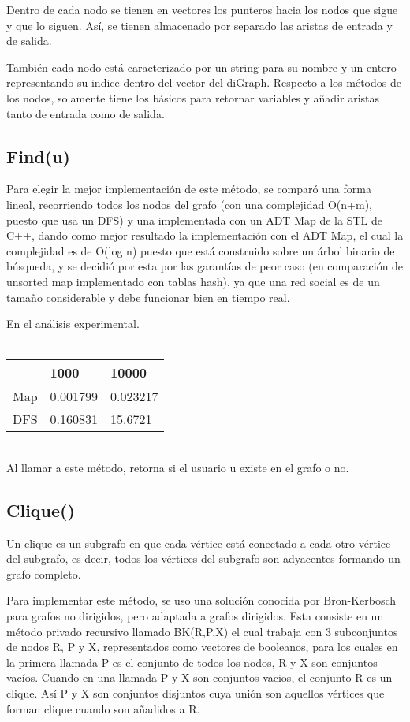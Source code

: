 \documentclass[12pt]{article}
\begin{document}
Dentro de cada nodo se tienen en vectores los punteros hacia los nodos que sigue y que lo siguen. Así, se tienen almacenado por separado las aristas de entrada y de salida.

También cada nodo está caracterizado por un string para su nombre y un entero representando su indice dentro del vector del diGraph. Respecto a los métodos de los nodos, solamente tiene los básicos para retornar variables y añadir aristas tanto de entrada como de salida.

\subsection{Find(u)}

\indent \indent Para elegir la mejor implementación de este método, se comparó una forma lineal, recorriendo todos los nodos del grafo (con una complejidad O(n+m), puesto que usa un DFS) y una implementada con un ADT Map de la STL de C++, dando como mejor resultado la implementación con el ADT Map, el cual la complejidad es de O(log n) puesto que está construido sobre un árbol binario de búsqueda, y se decidió por esta  por las garantías de peor caso (en comparación de unsorted map implementado con tablas hash), ya que una red social es de un tamaño considerable y debe funcionar bien en tiempo real.

En el análisis experimental.\\
\\
\begin{tabular}{l|l|l|}
\cline{2-3}
                          & 1000     & 10000    \\ \hline
\multicolumn{1}{|l|}{Map} & 0.001799 & 0.023217 \\ \hline
\multicolumn{1}{|l|}{DFS} & 0.160831 & 15.6721  \\ \hline
\end{tabular}
\\

Al llamar a este método, retorna si el usuario u existe en el grafo o no.

\subsection{Clique()}

\indent\indent Un clique es un subgrafo en que cada vértice está conectado a cada otro vértice del subgrafo, es decir, todos los vértices del subgrafo son adyacentes formando un grafo completo.

Para implementar este método, se uso una solución conocida por Bron-Kerbosch para grafos no dirigidos, pero adaptada a grafos dirigidos. Esta consiste en un método privado recursivo llamado BK(R,P,X) el cual trabaja con 3 subconjuntos de nodos R, P y X, representados como vectores de booleanos, para los cuales en la primera llamada P es el conjunto de  todos los nodos, R y X son conjuntos vacíos. Cuando en una llamada P y X son conjuntos vacios, el conjunto R es un clique. Así P y X son conjuntos disjuntos cuya unión son aquellos vértices que forman clique cuando son añadidos a R.
\end{document}
